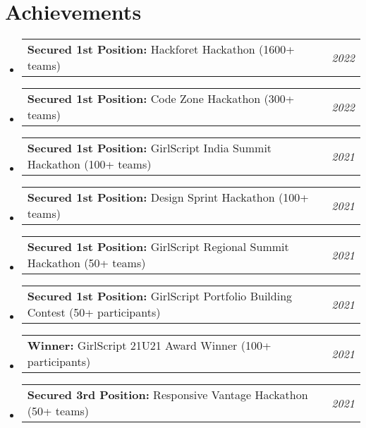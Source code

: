 \documentclass[a4paper,11pt]{article}
\makeatletter
\newcommand{\resumePOR}[3]{
\vspace{0.5mm}\item
    \begin{tabular*}{0.97\textwidth}[t]{l@{\extracolsep{\fill}}r}
        \textbf{#1}\hspace{0.3mm}#2 & \textit{\small{#3}} 
    \end{tabular*}
    \vspace{-2mm}
}
\newcommand{\resumeSubHeadingListStart}{\begin{itemize}[leftmargin=*,labelsep=0mm]}
\newcommand{\resumeSubHeadingListEnd}{\end{itemize}\vspace{2mm}}
\makeatother
\begin{document}


\section{\textbf{Achievements}}
\vspace{-0.4mm}
\resumeSubHeadingListStart
\resumePOR{Secured 1st Position: } %
    {Hackforet Hackathon (1600+ teams) } %
    {2022} %
\resumePOR{Secured 1st Position: } %
    {Code Zone Hackathon (300+ teams)} %
    {2022} %
\resumePOR{Secured 1st Position: } %
    {GirlScript India Summit Hackathon
(100+ teams)} %
    {2021} %
\resumePOR{Secured 1st Position: } %
    {Design Sprint Hackathon (100+ teams)} %
    {2021} %
\resumePOR{Secured 1st Position: } %
    {GirlScript Regional Summit Hackathon
(50+ teams)} %
    {2021} %
\resumePOR{Secured 1st Position: } %
    {GirlScript Portfolio Building Contest
(50+ participants)} %
    {2021} %
\resumePOR{Winner: } %
    {GirlScript 21U21 Award Winner (100+ participants)} %
    {2021} %
\resumePOR{Secured 3rd Position: } %
    {Responsive Vantage Hackathon
(50+ teams)} %
    {2021} %
    
    

\resumeSubHeadingListEnd
\end{document}
